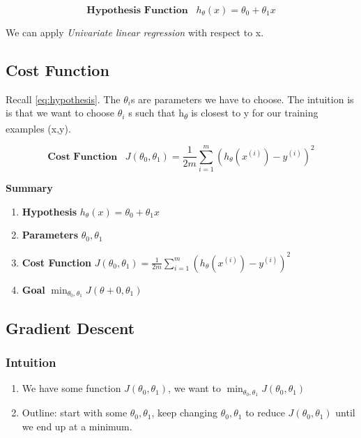 \documentclass[letter]{article}
\begin{document}
           \begin{equation} 
               \boxed{ 
                   \textbf{Hypothesis Function}\hspace{10pt}  h_\theta (x) = \theta_0 + \theta_1x
           }
              \label{eq:hypothesis}
           \end{equation}

           We can apply \emph{Univariate linear regression} with respect to x. 
    \subsection{Cost Function}

    Recall \ref{eq:hypothesis}. The $\theta_i$s are parameters we have to choose. The intuition is is that we want to choose $\theta_i$ s such that h\textsubscript{$\theta$} is closest to y for our training examples (x,y).
    

      \begin{equation} 
          \boxed{ 
              \textbf{Cost Function}\hspace{10pt} J(\theta_0, \theta_1) = \frac{1}{2m} \sum_{i=1}^{m} (h_\theta(x^{(i)}) - y^{(i)} )^2
      }
          \label{eq:cost}
      \end{equation}
      

      \par \textbf{Summary} 
      \begin{enumerate}
          \item \textbf{Hypothesis  }$h_\theta (x) = \theta_0 + \theta_1x$
          \item \textbf{Parameters } $\theta_0, \theta_1$
          \item \textbf{Cost Function }$J(\theta_0, \theta_1) = \frac{1}{2m} \sum_{i=1}^{m} (h_\theta(x^{(i)}) - y^{(i)} )^2$
          \item \textbf{Goal } $\min_{\theta_0, \theta_1} J(\theta+0, \theta_1)$
    
      \end{enumerate}
        

          
   
    
    \subsection{Gradient Descent}
        \subsubsection{Intuition}
            \begin{enumerate}
                \item We have some function $J(\theta_0, \theta_1)$, we want to $\min_{\theta_0, \theta_1} J (\theta_0, \theta_1)$
                \item Outline: start with some $\theta_0, \theta_1$, keep changing  $\theta_0, \theta_1$ to reduce $J(\theta_0, \theta_1)$ until we end up at a minimum. 
            \end{enumerate}
\end{document}
